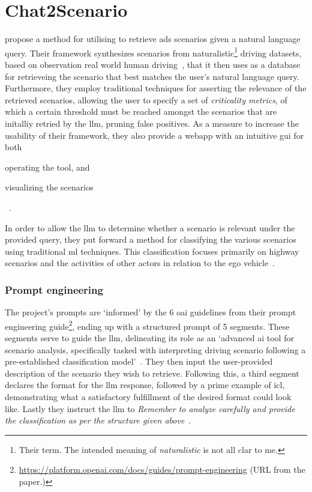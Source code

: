 \section{Chat2Scenario}

\citeauthor{chat2Scenario} propose a method for utilising  to retrieve
\acrshort{ads} scenarios given a natural language query. Their framework synthesizes scenarios from
naturalistic\footnote{Their term. The intended meaning of \textit{naturalistic} is not all clar to
  me.} driving datasets, based on observation real world human driving~\cite[55]{chat2Scenario}, that
it then uses as a database for retrieveing the scenario that best matches the user's natural
language query. Furthermore, they employ traditional techniques for asserting the relevance of the
retrieved scenarios, allowing the user to specify a set of \textit{criticality metrics}, of which a
certain threshold must be reached amongst the scenarios that are initalliy retried by the
\acrshort{llm}, pruning false positives. As a measure to increase the usability of their framework,
they also provide a webapp with an intuitive \acrshort{gui} for both \begin{inparaenum}
  \item operating the tool, and
  \item visualizing the scenarios \end{inparaenum}~\cite[560]{chat2Scenario}.

In order to allow the \acrshort{llm} to determine whether a scenario is relevant under the
provided query, they put forward a method for classifying the various scenarios using traditional
\acrshort{ml} techniques. This classification focuses primarily on highway scenarios and the
activities of other actors in relation to the ego vehicle~\cite[561-562]{chat2Scenario}.

\subsubsection*{Prompt engineering}


The project's prompts are `informed' by the \num{6} \acrlong{oai} guidelines from their prompt
engineering guide\footnote{\url{https://platform.openai.com/docs/guides/prompt-engineering} (URL
  from the paper.)}, ending up with a structured prompt of \num{5} segments. These segments serve to
guide the \acrshort{llm}, delineating its role as an `advanced \acrshort{ai} tool for scenario
analysis, specifically tasked with interpreting driving scenario following a pre-established
classification model'~\cite[562]{chat2Scenario}. They then input the user-provided description of
the scenario they wish to retrieve. Following this, a third segment declares the format for the
\acrshort{llm} response, followed by a prime example of \acrlong{icl}, demonstrating what a
satisfactory fulfillment of the desired format could look like. Lastly they instruct the
\acrshort{llm} to \textit{Remember to analyze carefully and provide the classification as per the
  structure given above}~\cite[563]{chat2Scenario}.

